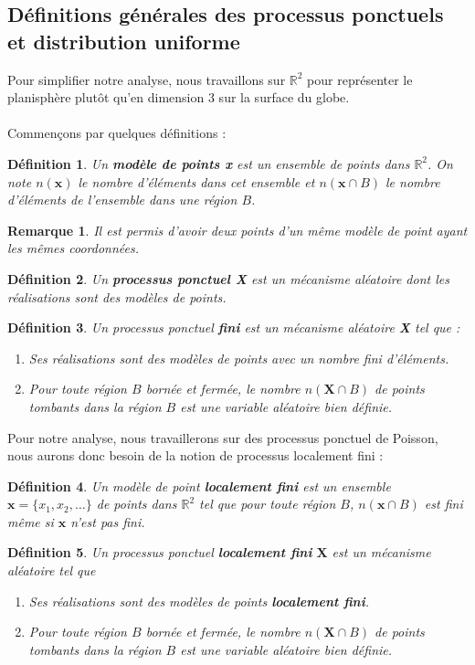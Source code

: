 \documentclass[12pt]{article}
\newcommand{\R}{\mathbb{R}}
\newtheorem*{rmq1}{Remarque}
\newtheorem*{defin1}{Définition}
\begin{document}
\subsection{Définitions générales des processus ponctuels et distribution uniforme}
Pour simplifier notre analyse, nous travaillons sur $\R^2$ pour représenter le planisphère plutôt qu'en dimension 3 sur la surface du globe.\\
\\
Commençons par quelques définitions :

\begin{defin1}
Un \textbf{modèle de points x} est un ensemble de points dans $\R^2$. On note $n(\textbf{x})$ le nombre d'éléments dans cet ensemble et $n(\textbf{x}\cap B)$ le nombre d'éléments de l'ensemble dans une région $B$.
\end{defin1}

\begin{rmq1}
Il est permis d'avoir deux points d'un même modèle de point ayant les mêmes coordonnées.
\end{rmq1}

\begin{defin1}
Un \textbf{processus ponctuel X} est un mécanisme aléatoire dont les réalisations sont des modèles de points.
\end{defin1}

\begin{defin1}
Un processus ponctuel \textbf{fini} est un mécanisme aléatoire \textbf{X} tel que :
\begin{enumerate}
    \item Ses réalisations sont des modèles de points avec un nombre fini d'éléments.
    \item Pour toute région $B$ bornée et fermée, le nombre $n(\textbf{X}\cap B)$ de points tombants dans la région $B$ est une variable aléatoire bien définie.
\end{enumerate}
\end{defin1}
Pour notre analyse, nous travaillerons sur des processus ponctuel de Poisson, nous aurons donc besoin de la notion de processus localement fini :

\begin{defin1}
Un modèle de point \textbf{localement fini} est un ensemble $\textbf{x} = \{x_1,x_2,\dots\}$ de points dans $\R^2$ tel que pour toute région $B$, $n(\textbf{x}\cap B)$ est fini même si $\textbf{x}$ n'est pas fini.
\end{defin1}

\begin{defin1}
Un processus ponctuel \textbf{localement fini} $\textbf{X}$ est un mécanisme aléatoire tel que
\begin{enumerate}
    \item Ses réalisations sont des modèles de points \textbf{localement fini}.
    \item Pour toute région $B$ bornée et fermée, le nombre $n(\textbf{X}\cap B)$ de points tombants dans la région $B$ est une variable aléatoire bien définie.
\end{enumerate}
\end{defin1}
\end{document}
